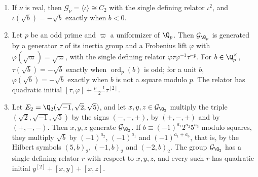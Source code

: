 \begin{lemma}\label{tw:local-groups}
\begin{enumerate}
\item[(a)] If $\nu$ is real, then $\mathcal G_\nu=\langle\iota\rangle\cong C_2$
 with the single defining relator $\iota^2$, and $\iota(\sqrt b)=-\sqrt b$
 exactly when $b<0$.
\item[(b)] Let $p$ be an odd prime and $\varpi$ a uniformizer of $\Q_p$. Then
 $\mathcal G_{\Q_p}$ is generated by a generator $\tau$ of its inertia group
 and a Frobenius lift $\varphi$ with $\varphi(\sqrt\varpi)=\sqrt\varpi$, with
 the single defining relator $\varphi\tau\varphi^{-1}\tau^{-p}$. For
 $b\in\Q_p^\times$, $\tau(\sqrt b)=-\sqrt b$ exactly when $\operatorname{ord}_p(b)$ is odd;
 for a unit $b$, $\varphi(\sqrt b)=-\sqrt b$ exactly when $b$ is not a square
 modulo $p$. The relator has quadratic initial
 $[\tau,\varphi]+\frac{p-1}2\tau^{[2]}$.
\item[(c)] Let $E_2=\Q_2(\sqrt{-1},\sqrt2,\sqrt5)$, and let
 $x,y,z\in\mathcal G_{\Q_2}$ multiply the triple $(\sqrt2,\sqrt{-1},\sqrt5)$
 by the signs $(-,+,+)$, by $(+,-,+)$ and by $(+,-,-)$. Then $x,y,z$
 generate $\mathcal G_{\Q_2}$. If $b\equiv(-1)^{a_1}2^{a_2}5^{a_3}$ modulo
 squares, they multiply $\sqrt b$ by $(-1)^{a_2}$, $(-1)^{a_1}$ and
 $(-1)^{a_1+a_3}$, that is, by the Hilbert symbols $(5,b)_2$, $(-1,b)_2$ and
 $(-2,b)_2$. The group $\mathcal G_{\Q_2}$ has a single defining relator $r$
 with respect to $x,y,z$, and every such $r$ has quadratic initial
 $y^{[2]}+[x,y]+[x,z]$.
\end{enumerate}
\end{lemma}

